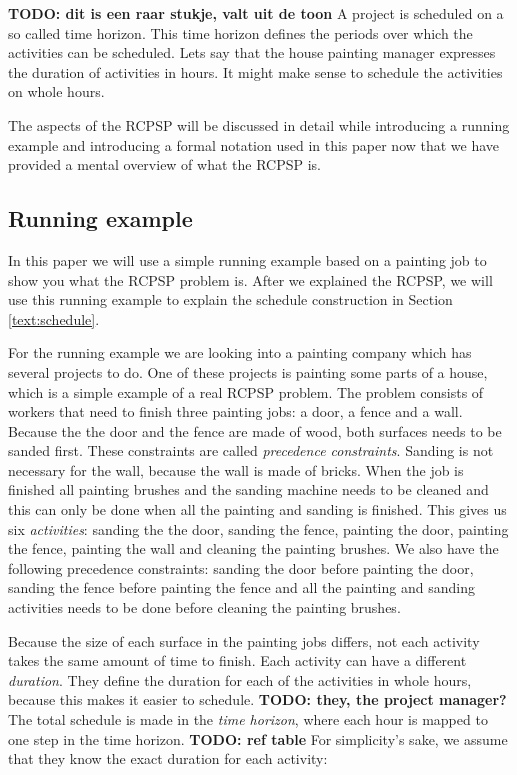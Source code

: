 \documentclass{article}
\theoremstyle{definition}
\newcommand{\TODO}[1]{{\color{red}\textbf{TODO: #1}}}
\begin{document}
\TODO{dit is een raar stukje, valt uit de toon}
A project is scheduled on a so called time horizon.
This time horizon defines the periods over which the activities can be scheduled.
Lets say that the house painting manager expresses the duration of activities in hours.
It might make sense to schedule the activities on whole hours.

The aspects of the RCPSP will be discussed in detail while introducing a running example and introducing a formal notation used in this paper now that we have provided a mental overview of what the RCPSP is. 

\subsection{Running example}
In this paper we will use a simple running example based on a painting job to show you what the RCPSP problem is.
After we explained the RCPSP, we will use this running example to explain the schedule construction in Section \ref{text:schedule}.

For the running example we are looking into a painting company which has several projects to do.
One of these projects is painting some parts of a house, which is a simple example of a real RCPSP problem.
The problem consists of workers that need to finish three painting jobs: a door, a fence and a wall.
Because the the door and the fence are made of wood, both surfaces needs to be sanded first.
These constraints are called \emph{precedence constraints}.
Sanding is not necessary for the wall, because the wall is made of bricks.
When the job is finished all painting brushes and the sanding machine needs to be cleaned and this can only be done when all the painting and sanding is finished.
This gives us six \emph{activities}: sanding the the door, sanding the fence,  painting the door, painting the fence, painting the wall and cleaning the painting brushes.
We also have the following precedence constraints: sanding the door before painting the door, sanding the fence before painting the fence and all the painting and sanding activities needs to be done before cleaning the painting brushes.

Because the size of each surface in the painting jobs differs, not each activity takes the same amount of time to finish.
Each activity can have a different \emph{duration}.
They define the duration for each of the activities in whole hours, because this makes it easier to schedule. \TODO{they, the project manager?}
The total schedule is made in the \emph{time horizon}, where each hour is mapped to one step in the time horizon. \TODO{ref table}
For simplicity's sake, we assume that they know the exact duration for each activity:
\end{document}
